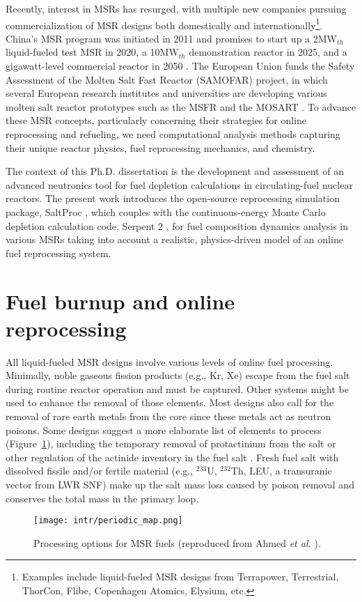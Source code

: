 Recently, interest in \glspl{MSR} has resurged, with multiple new companies 
pursuing commercialization of \gls{MSR} designs both domestically and 
internationally\footnote{Examples include liquid-fueled \gls{MSR} designs from 
Terrapower, Terrestrial, ThorCon, Flibe, Copenhagen Atomics, Elysium, etc.}. 
China's \gls{MSR} program was initiated in 2011 and promises to start up a  
2MW$_{th}$ liquid-fueled test \gls{MSR} in 2020, a 10MW$_{th}$ demonstration 
reactor in 2025, and a gigawatt-level 
commercial reactor in 2050 \cite{zhang_review_2018}. The European 
Union funds the Safety Assessment of the Molten Salt Fast Reactor 
(SAMOFAR) project, in which several European research institutes and 
universities are developing various molten salt reactor prototypes 
such as the \gls{MSFR} \cite{fiorina_molten_2013} and the \gls{MOSART} 
\cite{ignatiev_molten_2014}. To advance these \gls{MSR} concepts, particularly 
concerning their strategies for online reprocessing and refueling, we need 
computational analysis methods capturing their unique reactor 
physics, fuel reprocessing mechanics, and chemistry.

The context of this Ph.D. dissertation is the development and assessment of an 
advanced neutronics tool for fuel depletion calculations in circulating-fuel 
nuclear reactors. The present work introduces the open-source reprocessing 
simulation package, SaltProc \cite{rykhlevskii_arfc/saltproc_2018}, which 
couples with the continuous-energy Monte Carlo depletion calculation code, 
Serpent 2 \cite{leppanen_serpent_2014}, for fuel composition dynamics analysis 
in various \glspl{MSR} taking into account a realistic, physics-driven
model of an online fuel reprocessing system.

\section{Fuel burnup and online reprocessing}\label{sec:litreview}
All liquid-fueled \gls{MSR} designs involve various levels of online fuel 
processing. Minimally, noble gaseous fission products (e.g., Kr, Xe) 
escape from the fuel salt during routine reactor operation and must be 
captured. Other systems might be used to enhance the removal of those 
elements. Most designs also call for the removal of rare earth metals from 
the core since these metals act as neutron poisons. Some designs suggest a 
more elaborate list of elements to process (Figure~\ref{fig:periodic_tab}), 
including the temporary removal of protactinium from the salt or other 
regulation of the actinide inventory in the fuel salt 
\cite{ahmad_neutronics_2015}. Fresh fuel salt with dissolved fissile and/or 
fertile material (e.g., $^{233}$U, $^{232}$Th, \gls{LEU}, a transuranic 
vector from \gls{LWR} \gls{SNF}) make up the salt mass loss caused by poison 
removal and conserves the total mass in the primary loop.
\begin{figure}[htp!] %
	\centering
	\texttt{[image: intr/periodic\_map.png]}
	\caption{Processing options for \gls{MSR} fuels (reproduced from 
		Ahmed \emph{et al.} \cite{ahmad_neutronics_2015}).}
	\label{fig:periodic_tab}
\end{figure}


